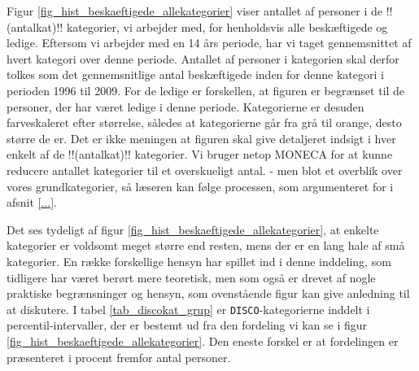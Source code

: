 Figur \ref{fig_hist_beskaeftigede_allekategorier} viser antallet af personer i de !!(antalkat)!!	 kategorier, vi arbejder med, for henholdsvis alle beskæftigede og ledige. Eftersom vi arbejder med en 14 års periode, har vi taget gennemsnittet af hvert kategori over denne periode. Antallet af personer i kategorien skal derfor tolkes som det gennemsnitlige antal beskæftigede inden for denne kategori i perioden 1996 til 2009. For de ledige er forskellen, at figuren er begrænset til de personer, der har været ledige i denne periode. Kategorierne er desuden farveskaleret efter størrelse, således at kategorierne går fra grå til orange, desto større de er. Det er ikke meningen at figuren skal give detaljeret indsigt i hver enkelt af de !!(antalkat)!! kategorier. Vi bruger netop MONECA for at kunne reducere antallet kategorier til et overskueligt antal. - men blot et overblik over vores grundkategorier, så læseren kan følge processen, som argumenteret for i afsnit \ref{...}. %
% 

Det ses tydeligt af figur \ref{fig_hist_beskaeftigede_allekategorier}, at enkelte kategorier er voldsomt meget større end resten, mens der er en lang hale af små kategorier. En række forskellige hensyn har spillet ind i denne inddeling, som tidligere har været berørt mere teoretisk, men som også er drevet af nogle praktiske begrænsninger og hensyn, som ovenstående figur kan give anledning til at diskutere. I tabel \ref{tab_discokat_grup} er \texttt{DISCO}-kategorierne inddelt i percentil-intervaller, der er bestemt ud fra den fordeling vi kan se i figur \ref{fig_hist_beskaeftigede_allekategorier}. Den eneste forskel er at fordelingen er præsenteret i procent fremfor antal personer. %

